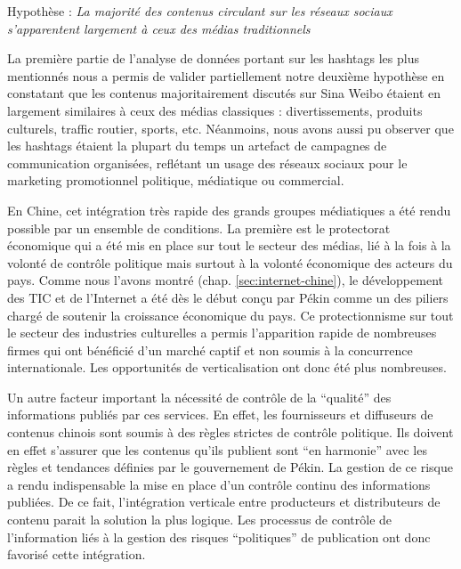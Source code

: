 Hypothèse : \textit{La majorité des contenus circulant sur les réseaux sociaux s'apparentent largement à ceux des médias traditionnels} 

La première partie de l{\textquoteright}analyse de données portant sur les hashtags les plus mentionnés nous a permis de valider partiellement notre deuxième hypothèse en constatant que les contenus majoritairement discutés sur Sina Weibo étaient en largement similaires à ceux des médias classiques : divertissements, produits culturels, traffic routier, sports, etc. Néanmoins, nous avons aussi pu observer que les hashtags étaient la plupart du temps un artefact de campagnes de communication organisées, reflétant un usage des réseaux sociaux pour le marketing promotionnel politique, médiatique ou commercial. 


En Chine, cet intégration très rapide des grands groupes médiatiques a été rendu possible par un ensemble de conditions. La première est le protectorat économique qui a été mis en place sur tout le secteur des médias, lié à la fois à la volonté de contrôle politique mais surtout à la volonté économique des acteurs du pays. Comme nous l'avons montré (chap. \ref{sec:internet-chine}), le développement des TIC et de l'Internet a été dès le début conçu par Pékin comme un des piliers chargé de soutenir la croissance économique du pays. Ce protectionnisme sur tout le secteur des industries culturelles a permis l'apparition rapide de nombreuses firmes qui ont bénéficié d'un marché captif et non soumis à la concurrence internationale. Les opportunités de verticalisation ont donc été plus nombreuses. 

Un autre facteur important la nécessité de contrôle de la ``qualité'' des informations publiés par ces services. En effet, les fournisseurs et diffuseurs de contenus chinois sont soumis à des règles strictes de contrôle politique. Ils doivent en effet s'assurer que les contenus qu'ils publient sont ``en harmonie'' avec les règles et tendances définies par le gouvernement de Pékin. La gestion de ce risque a rendu indispensable la mise en place d'un contrôle continu des informations publiées. De ce fait, l'intégration verticale entre producteurs et distributeurs de contenu parait la solution la plus logique. Les processus de contrôle de l'information liés à la gestion des risques ``politiques'' de publication ont donc favorisé cette intégration.

